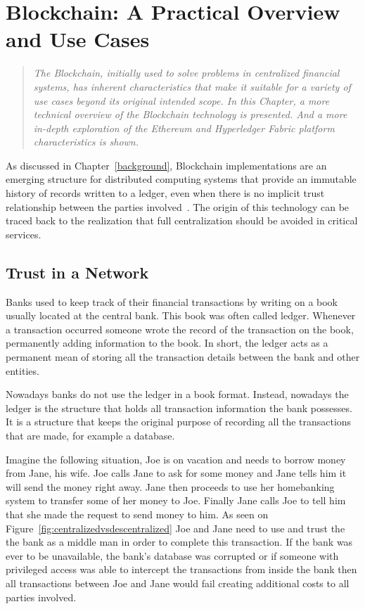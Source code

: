 \chapter{Blockchain: A Practical Overview and Use Cases}\label{blockchain}

\begin{quote} 
  \emph{The Blockchain, initially used to solve problems in centralized
  financial systems, has inherent characteristics that make it suitable for a
  variety of use cases beyond its original intended scope. In this Chapter, a
  more technical overview of the Blockchain technology is presented. And a more
  in-depth exploration of the Ethereum and Hyperledger Fabric platform
  characteristics is shown.}
\end{quote}

As discussed in Chapter~\ref{background}, Blockchain implementations are an
emerging structure for distributed computing systems that provide an immutable
history of records written to a ledger, even when there is no implicit trust
relationship between the parties involved~\cite{Barclay2017}. The origin of
this technology can be traced back to the realization that full centralization
should be avoided in critical services.

\section{Trust in a Network}

Banks used to keep track of their financial transactions by writing on a book
usually located at the central bank. This book was often called ledger.
Whenever a transaction occurred someone wrote the record of the transaction on
the book, permanently adding information to the book. In short, the ledger acts
as a permanent mean of storing all the transaction details between the bank and
other entities. 

Nowadays banks do not use the ledger in a book format. Instead, nowadays the
ledger is the structure that holds all transaction information the bank
possesses. It is a structure that keeps the original purpose of recording all
the transactions that are made, for example a database.

Imagine the following situation, Joe is on vacation and needs to borrow money
from Jane, his wife. Joe calls Jane to ask for some money and Jane tells him it
will send the money right away. Jane then proceeds to use her homebanking
system to transfer some of her money to Joe. Finally Jane calls Joe to tell him
that she made the request to send money to him.  As seen on
Figure~\ref{fig:centralizedvsdescentralized} Joe and Jane need to use and trust
the the bank as a middle man in order to complete this transaction. If the bank
was ever to be unavailable, the bank's database was corrupted or if someone
with  privileged access was able to intercept the transactions from inside the
bank then all transactions between Joe and Jane would fail creating additional
costs to all parties involved. 

